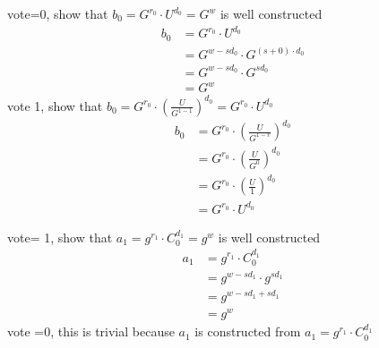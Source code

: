 \begin{infobox}[Explanation of \begin{math}b_0 = G^{r_0} \cdot U^{d_0}\end{math}]
vote=0, show that \begin{math}b_0 = G^{r_0} \cdot U^{d_0} = G^w \end{math} is well constructed
\begin{align*}
    b_0 &= G^{r_0} \cdot U^{d_0}                    \\
        &= G^{w-sd_0} \cdot G^{(s+0) \cdot d_{0}}   \\
        &= G^{w-sd_0} \cdot G^{sd_{0}}              \\
        &= G^w                                          
\end{align*}
vote 1, show that \begin{math}b_0 = G^{r_0} \cdot (\frac{U}{G^{1-1}})^{d_0}=  G^{r_0} \cdot U^{d_0} \end{math}
\begin{align*}
    b_0 &= G^{r_0} \cdot (\frac{U}{G^{1-v}})^{d_0}  \\
        &= G^{r_0} \cdot (\frac{U}{G^{0}})^{d_0}    \\
        &= G^{r_0} \cdot (\frac{U}{1})^{d_0}        \\
        &= G^{r_0} \cdot U^{d_0}  
\end{align*}
\end{infobox}



\begin{infobox}[Explanation of \begin{math}a_1=g^{r_1}  \cdot  C^{d_1}_0\end{math}]
vote= 1, show that \begin{math}a_1=g^{r_1}  \cdot  C^{d_1}_0 = g^w \end{math} is well constructed
\begin{align*}
    a_1 &= g^{r_1}  \cdot  C^{d_1}_0    \\
        &= g^{w-sd_1} \cdot  g^{sd_1}   \\
        &= g^{w-sd_1+ sd_1}             \\
        &= g^w
\end{align*}
vote =0, this is trivial because \begin{math}a_1 \end{math} is constructed from \begin{math}a_1=g^{r_1}  \cdot  C^{d_1}_0 \end{math}
\end{infobox}


